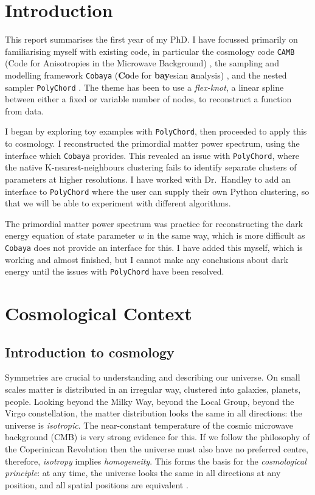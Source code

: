 \documentclass{article}
\begin{document}
\newpage

\tableofcontents

\newpage

\section{Introduction}
This report summarises the first year of my PhD. I have focussed primarily on familiarising myself with existing code, in particular the cosmology code \texttt{CAMB} (Code for Anisotropies in the Microwave Background) \cite{CAMB_1, CAMB_2}, the sampling and modelling framework \texttt{Cobaya} (\textbf{Co}de for \textbf{bay}esian \textbf{a}nalysis) \cite{Cobaya}, and the nested sampler \texttt{PolyChord} \cite{PolyChord_1, PolyChord_2}. The theme has been to use a \textit{flex-knot}, a linear spline between either a fixed or variable number of nodes, to reconstruct a function from data.

I began by exploring toy examples with \texttt{PolyChord}, then proceeded to apply this to cosmology. I reconstructed the primordial matter power spectrum, using the interface which \texttt{Cobaya} provides. This revealed an issue with \texttt{PolyChord}, where the native K-nearest-neighbours clustering fails to identify separate clusters of parameters at higher resolutions. I have worked with Dr.~Handley to add an interface to \texttt{PolyChord} where the user can supply their own Python clustering, so that we will be able to experiment with different algorithms.

The primordial matter power spectrum was practice for reconstructing the dark energy equation of state parameter $w$ in the same way, which is more difficult as \texttt{Cobaya} does not provide an interface for this. I have added this myself, which is working and almost finished, but I cannot make any conclusions about dark energy until the issues with \texttt{PolyChord} have been resolved. 

\section{Cosmological Context}
\label{sec:context}
\subsection{Introduction to cosmology}
Symmetries are crucial to understanding and describing our universe. On small scales matter is distributed in an irregular way, clustered into galaxies, planets, people. Looking beyond the Milky Way, beyond the Local Group, beyond the Virgo constellation, the matter distribution looks the same in all directions: the universe is \textit{isotropic}. The near-constant temperature of the cosmic microwave background (CMB) is very strong evidence for this. If we follow the philosophy of the Coperinican Revolution \cite{copernicus} then the universe must also have no preferred centre, therefore, \textit{isotropy} implies \textit{homogeneity}. This forms the basis for the \textit{cosmological principle}: at any time, the universe looks the same in all directions at any position, and all spatial positions are equivalent \cite{hob-efs-las-2006}.
\end{document}
